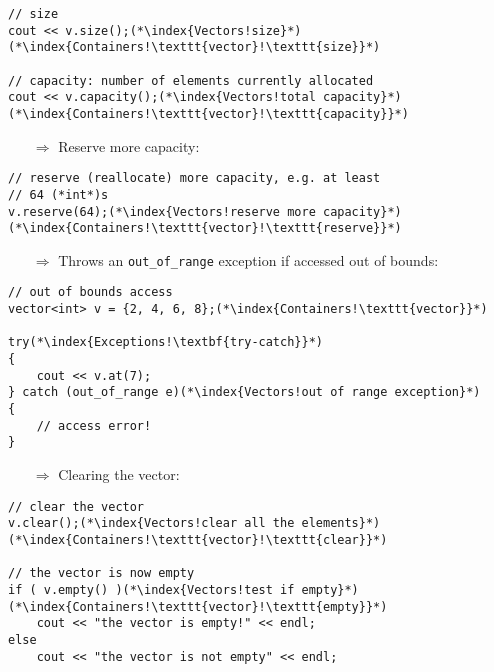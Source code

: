 \documentclass[10pt]{book}
\begin{document}
\begin{lstlisting}
// size
cout << v.size();(*\index{Vectors!size}*)(*\index{Containers!\texttt{vector}!\texttt{size}}*)

// capacity: number of elements currently allocated
cout << v.capacity();(*\index{Vectors!total capacity}*)(*\index{Containers!\texttt{vector}!\texttt{capacity}}*)
\end{lstlisting}
\begin{enumerate}
\item[$\Rightarrow$] Reserve more capacity:
\end{enumerate}
\begin{lstlisting}
// reserve (reallocate) more capacity, e.g. at least
// 64 (*int*)s
v.reserve(64);(*\index{Vectors!reserve more capacity}*)(*\index{Containers!\texttt{vector}!\texttt{reserve}}*)
\end{lstlisting}
\begin{enumerate}
\item[$\Rightarrow$] Throws an \texttt{out\_of\_range} exception if accessed out of bounds:
\end{enumerate}
\begin{lstlisting}
// out of bounds access
vector<int> v = {2, 4, 6, 8};(*\index{Containers!\texttt{vector}}*)

try(*\index{Exceptions!\textbf{try-catch}}*)
{
    cout << v.at(7);
} catch (out_of_range e)(*\index{Vectors!out of range exception}*)
{
    // access error!
}
\end{lstlisting}
\begin{enumerate}
\item[$\Rightarrow$] Clearing the vector:
\end{enumerate}
\begin{lstlisting}
// clear the vector
v.clear();(*\index{Vectors!clear all the elements}*)(*\index{Containers!\texttt{vector}!\texttt{clear}}*)

// the vector is now empty
if ( v.empty() )(*\index{Vectors!test if empty}*)(*\index{Containers!\texttt{vector}!\texttt{empty}}*)
    cout << "the vector is empty!" << endl;
else
    cout << "the vector is not empty" << endl;
\end{lstlisting}
%
%
\end{document}
